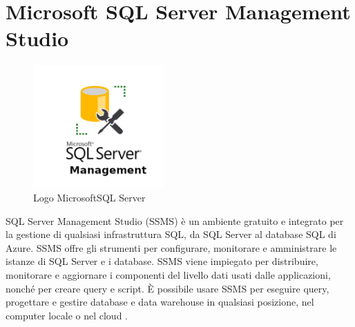 \section{Microsoft SQL Server Management Studio}
\begin{figure}[ht!]
\begin{center}
  \includegraphics[width=5cm]{images/mssql.png}
  \caption{Logo MicrosoftSQL Server}
\end{center}
\end{figure}
SQL Server Management Studio (SSMS) è un ambiente gratuito e integrato per la gestione di qualsiasi infrastruttura SQL, da SQL Server al database SQL di Azure. SSMS offre gli strumenti per configurare, monitorare e amministrare le istanze di SQL Server e i database. SSMS viene impiegato per distribuire, monitorare e aggiornare i componenti del livello dati usati dalle applicazioni, nonché per creare query e script.
È possibile usare SSMS per eseguire query, progettare e gestire database e data warehouse in qualsiasi posizione, nel computer locale o nel cloud \cite{MSSQL}.

\pagebreak

